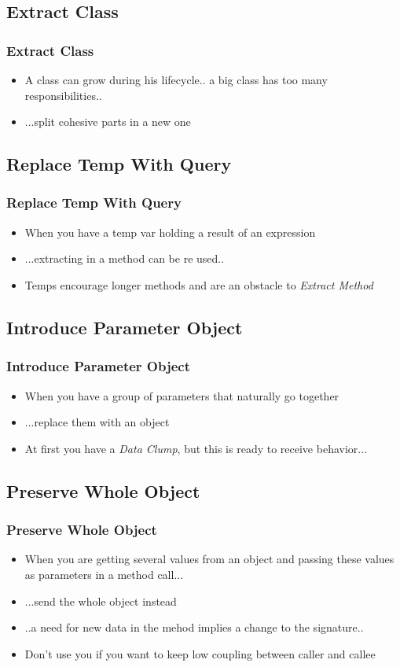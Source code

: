 \documentclass{beamer}
\begin{document}
\subsection{Extract Class}
\begin{frame}
  \frametitle{Extract Class}
  \begin{itemize}
	\item<+-> A class can grow during his lifecycle.. a big class has too many responsibilities..
	\item<+-> ...split cohesive parts in a new one
  \end{itemize}
\end{frame}

\subsection{Replace Temp With Query}
\begin{frame}
  \frametitle{Replace Temp With Query}
  \begin{itemize}
	\item<+-> When you have a temp var holding a result of an expression
	\item<+-> ...extracting in a method can be re used..
	\item<+-> Temps encourage longer methods and are an obstacle to \textit{Extract Method}
  \end{itemize}
\end{frame}

\subsection{Introduce Parameter Object}
\begin{frame}
  \frametitle{Introduce Parameter Object}
  \begin{itemize}
	\item<+-> When you have a group of parameters that naturally go together
	\item<+-> ...replace them with an object
	\item<+-> At first you have a \textit{Data Clump}, but this is ready to receive behavior...
  \end{itemize}
\end{frame}

\subsection{Preserve Whole Object}
\begin{frame}
  \frametitle{Preserve Whole Object}
  \begin{itemize}
	\item<+-> When you are getting several values from an object and passing these values as parameters in a method call...
	\item<+-> ...send the whole object instead
	\item<+-> ..a need for new data in the mehod implies a change to the signature..
	\item<+-> Don't use you if you want to keep low coupling between caller and callee
  \end{itemize}
\end{frame}
\end{document}
